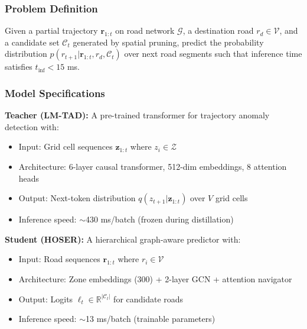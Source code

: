 \subsubsection{Problem Definition}
\label{sec:method-problem}

\begin{definition}
Given a partial trajectory $\mathbf{r}_{1:t}$ on road network $\mathcal{G}$, a destination road $r_d \in \mathcal{V}$, and a candidate set $\mathcal{C}_t$ generated by spatial pruning, predict the probability distribution $p(r_{t+1} | \mathbf{r}_{1:t}, r_d, \mathcal{C}_t)$ over next road segments such that inference time satisfies $t_{\text{inf}} < 15$ ms.
\end{definition}

\subsubsection{Model Specifications}
\label{sec:method-models}

\textbf{Teacher (LM-TAD):} A pre-trained transformer for trajectory anomaly detection with:
\begin{itemize}[leftmargin=*,noitemsep,topsep=0pt]
\item Input: Grid cell sequences $\mathbf{z}_{1:t}$ where $z_i \in \mathcal{Z}$
\item Architecture: 6-layer causal transformer, 512-dim embeddings, 8 attention heads
\item Output: Next-token distribution $q(z_{t+1} | \mathbf{z}_{1:t})$ over $V$ grid cells
\item Inference speed: $\sim$430 ms/batch (frozen during distillation)
\end{itemize}

\textbf{Student (HOSER):} A hierarchical graph-aware predictor with:
\begin{itemize}[leftmargin=*,noitemsep,topsep=0pt]
\item Input: Road sequences $\mathbf{r}_{1:t}$ where $r_i \in \mathcal{V}$
\item Architecture: Zone embeddings (300) + 2-layer GCN + attention navigator
\item Output: Logits $\ell_t \in \mathbb{R}^{|\mathcal{C}_t|}$ for candidate roads
\item Inference speed: $\sim$13 ms/batch (trainable parameters)
\end{itemize}

